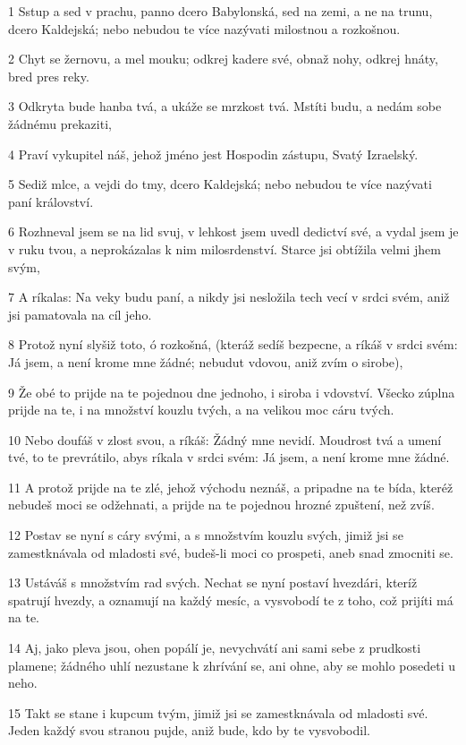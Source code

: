 \par 1 Sstup a sed v prachu, panno dcero Babylonská, sed na zemi, a ne na trunu, dcero Kaldejská; nebo nebudou te více nazývati milostnou a rozkošnou.
\par 2 Chyt se žernovu, a mel mouku; odkrej kadere své, obnaž nohy, odkrej hnáty, bred pres reky.
\par 3 Odkryta bude hanba tvá, a ukáže se mrzkost tvá. Mstíti budu, a nedám sobe žádnému prekaziti,
\par 4 Praví vykupitel náš, jehož jméno jest Hospodin zástupu, Svatý Izraelský.
\par 5 Sediž mlce, a vejdi do tmy, dcero Kaldejská; nebo nebudou te více nazývati paní království.
\par 6 Rozhneval jsem se na lid svuj, v lehkost jsem uvedl dedictví své, a vydal jsem je v ruku tvou, a neprokázalas k nim milosrdenství. Starce jsi obtížila velmi jhem svým,
\par 7 A ríkalas: Na veky budu paní, a nikdy jsi nesložila tech vecí v srdci svém, aniž jsi pamatovala na cíl jeho.
\par 8 Protož nyní slyšiž toto, ó rozkošná, (kteráž sedíš bezpecne, a ríkáš v srdci svém: Já jsem, a není krome mne žádné; nebudut vdovou, aniž zvím o sirobe),
\par 9 Že obé to prijde na te pojednou dne jednoho, i siroba i vdovství. Všecko zúplna prijde na te, i na množství kouzlu tvých, a na velikou moc cáru tvých.
\par 10 Nebo doufáš v zlost svou, a ríkáš: Žádný mne nevidí. Moudrost tvá a umení tvé, to te prevrátilo, abys ríkala v srdci svém: Já jsem, a není krome mne žádné.
\par 11 A protož prijde na te zlé, jehož východu neznáš, a pripadne na te bída, kteréž nebudeš moci se odžehnati, a prijde na te pojednou hrozné zpuštení, než zvíš.
\par 12 Postav se nyní s cáry svými, a s množstvím kouzlu svých, jimiž jsi se zamestknávala od mladosti své, budeš-li moci co prospeti, aneb snad zmocniti se.
\par 13 Ustáváš s množstvím rad svých. Nechat se nyní postaví hvezdári, kteríž spatrují hvezdy, a oznamují na každý mesíc, a vysvobodí te z toho, což prijíti má na te.
\par 14 Aj, jako pleva jsou, ohen popálí je, nevychvátí ani sami sebe z prudkosti plamene; žádného uhlí nezustane k zhrívání se, ani ohne, aby se mohlo posedeti u neho.
\par 15 Takt se stane i kupcum tvým, jimiž jsi se zamestknávala od mladosti své. Jeden každý svou stranou pujde, aniž bude, kdo by te vysvobodil.

